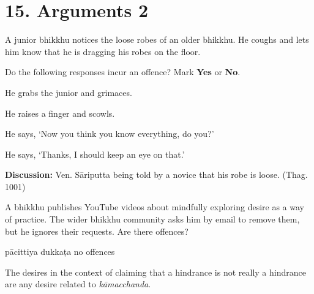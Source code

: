 \chapter{15. Arguments 2}
\renewcommand*{\theChapterTitle}{15. Arguments 2}

\begin{exam}{\autoExamName}

  \begin{problem*}

    A junior bhikkhu notices the loose robes of an older bhikkhu.
    He coughs and lets him know that he is dragging his robes on the floor.

    \bigskip

    Do the following responses incur an offence? Mark \textbf{Yes} or \textbf{No}.

    \bigskip

      \begin{parts}

      \item {} He grabs the junior and grimaces.
      \item {} He raises a finger and scowls.
      \item {} He says, `Now you think you know everything, do you?'
      \item {} He says, `Thanks, I should keep an eye on that.'

      \end{parts}

    \bigskip

    \textbf{Discussion:} Ven. Sāriputta being told by a novice that his robe is loose. (Thag. 1001)
    
  \end{problem*}

  \problemDivide

  \begin{problem}

  A bhikkhu publishes YouTube videos about mindfully exploring desire as a way
  of practice. The wider bhikkhu community asks him by email to remove them, but
  he ignores their requests. Are there offences?

  \bigskip

  \begin{answers}{3}
    \bChoices
     pācittiya\eAns
     dukkaṭa\eAns
     no offences\eAns
    \eChoices
  \end{answers}

  \begin{solution}
    The desires in the context of claiming that a hindrance is not really a
    hindrance are any desire related to \emph{kāmacchanda}.


\end{solution}
\end{problem}
\end{exam}
